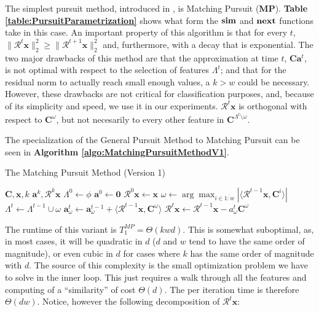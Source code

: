 \documentclass[12pt,a4paper,oneside,english]{UPBThesis}
\newcommand{\hcrange}[2]{\overline{{#1}\colon\!\!{#2}}}
\begin{document}
The simplest pursuit method, introduced in \cite{matchingpursuit1}, is Matching Pursuit (\textbf{MP}). \textbf{Table \ref{table:PursuitParametrization}} shows what form the $\text{\textbf{sim}}$ and $\text{\textbf{next}}$ functions take in this case. An important property of this algorithm is that for every $t$, $\|\mathcal{R}^t\textbf{x}\|_2^2 \geq \|\mathcal{R}^{t+1}\textbf{x}\|_2^2$ and, furthermore, with a decay that is exponential. The two major drawbacks of this method are that the approximation at time $t$, $\textbf{C}\textbf{a}^t$, is not optimal with respect to the selection of features $\Lambda^t$; and that for the residual norm to actually reach small enough values, a $k > w$ could be necessary. However, these drawbacks are not critical for classification purposes, and, because of its simplicity and speed, we use it in our experiments. $\mathcal{R}^t\textbf{x}$ is orthogonal with respect to $\textbf{C}^\omega$, but not necesarily to every other feature in $\textbf{C}^{\Lambda^t \setminus \omega}$.

The specialization of the General Pursuit Method to Matching Pursuit can be seen in \textbf{Algorithm \ref{algo:MatchingPursuitMethodV1}}.

\begin{algorithm}
\caption{The Matching Pursuit Method (Version 1)}
\label{algo:MatchingPursuitMethodV1}
\begin{algorithmic}
\Require $\textbf{C},\textbf{x},k$
\Ensure $\textbf{a}^k,\mathcal{R}^k\textbf{x}$
\State $\Lambda^0 \gets \phi$
\State $\textbf{a}^0 \gets \textbf{0}$
\State $\mathcal{R}^0\textbf{x} \gets \textbf{x}$
\For {$t = \hcrange{1}{k}$}
\State $\omega \gets \arg \max_{i \in \hcrange{1}{w}} \left| \langle \mathcal{R}^{t-1}\textbf{x}, \textbf{C}^i \rangle \right|$
\State $\Lambda^t \gets \Lambda^{t-1} \cup \omega$
\State $\textbf{a}_\omega^t \gets \textbf{a}_\omega^{t-1} + \langle \mathcal{R}^{t-1}\textbf{x} , \textbf{C}^\omega \rangle$
\State $\mathcal{R}^t\textbf{x} \gets \mathcal{R}^{t-1}\textbf{x} - a_\omega^t\textbf{C}^\omega$
\EndFor
\end{algorithmic}
\end{algorithm}

The runtime of this variant is $T_1^{MP} = \Theta(kwd)$. This is somewhat suboptimal, as, in most cases, it will be quadratic in $d$ ($d$ and $w$ tend to have the same order of magnitude), or even cubic in $d$ for cases where $k$ has the same order of magnitude with $d$. The source of this complexity is the small optimization problem we have to solve in the inner loop. This just requires a walk through all the features and computing of a ``similarity'' of cost $\Theta(d)$. The per iteration time is therefore $\Theta(dw)$. Notice, however the following decomposition of $\mathcal{R}^t\textbf{x}$:
\end{document}
